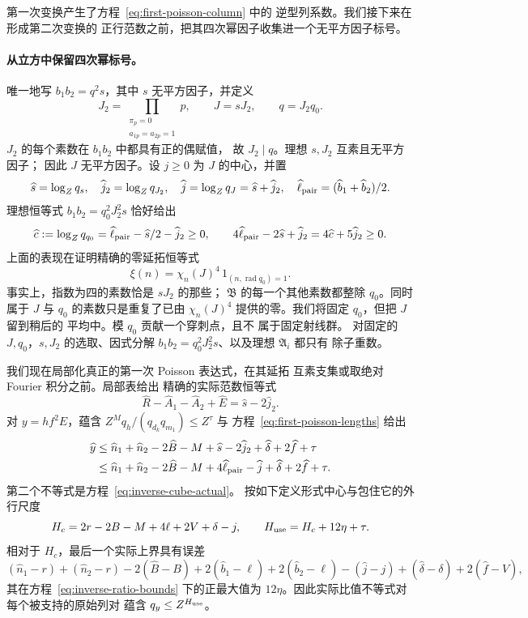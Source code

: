 第一次变换产生了方程~\eqref{eq:first-poisson-column} 中的
逆型列系数。我们接下来在形成第二次变换的
正行范数之前，把其四次幂因子收集进一个无平方因子标号。

\paragraph{从立方中保留四次幂标号。}
唯一地写 \(b_1b_2=q^2s\)，其中 \(s\) 无平方因子，并定义
\[
 J_2=\prod_{\substack{\pi_p=0\\a_{1p}=a_{2p}=1}}p,\qquad
 J=sJ_2,\qquad q=J_2q_0.
\]
\(J_2\) 的每个素数在 \(b_1b_2\) 中都具有正的偶赋值，
故 \(J_2\mid q\)。理想 \(s,J_2\) 互素且无平方因子；
因此 \(J\) 无平方因子。设 \(j\ge0\) 为 \(J\) 的中心，并置
\[
 \widehat s=\log_Zq_s,\quad \widehat j_2=\log_Zq_{J_2},\quad
 \widehat j=\log_Zq_J=\widehat s+\widehat j_2,\quad
 \widehat\ell_{\rm pair}=(\widehat b_1+\widehat b_2)/2.
\]
理想恒等式 \(b_1b_2=q_0^2J_2^2s\) 恰好给出
\begin{equation}\label{eq:inverse-cube-actual}
 \widehat c:=\log_Zq_{q_0}
   =\widehat\ell_{\rm pair}-\widehat s/2-\widehat j_2\ge0,
 \qquad
 4\widehat\ell_{\rm pair}-2\widehat s+\widehat j_2
   =4\widehat c+5\widehat j_2\ge0.
\end{equation}
上面的表现在证明精确的零延拓恒等式
\begin{equation}\label{eq:retained-cube-label}
 \xi(n)=\chi_n(J)^4\,1_{(n,\operatorname{rad}q_0)=1}.
\end{equation}
事实上，指数为四的素数恰是 \(sJ_2\) 的那些；
\(\mathfrak B\) 的每一个其他素数都整除 \(q_0\)。同时属于
\(J\) 与 \(q_0\) 的素数只是重复了已由
\(\chi_n(J)^4\) 提供的零。我们将固定 \(q_0\)，但把 \(J\) 留到稍后的
平均中。模 \(q_0\) 贡献一个穿刺点，且不
属于固定射线群。
对固定的 \(J,q_0\)，\(s,J_2\) 的选取、因式分解
\(b_1b_2=q_0^2J_2^2s\)、以及理想 \(\mathfrak A_i\) 都只有
除子重数。

我们现在局部化真正的第一次 Poisson 表达式，在其延拓
互素支集或取绝对 Fourier 积分之前。局部表给出
精确的实际范数恒等式
\[
 \widehat R-\widehat A_1-\widehat A_2+\widehat E
       =\widehat s-2\widehat j_2.
\]
对 \(y=hf^2E\)，蕴含
\(Z^Mq_h/(q_{d_k}q_{m_1})\le Z^\tau\) 与
方程~\eqref{eq:first-poisson-lengths} 给出
\[
 \begin{split}
 \widehat y
 &\le \widehat n_1+\widehat n_2-2\widehat B-M
       +\widehat s-2\widehat j_2+\widehat\delta+2\widehat f+\tau\\
 &\le \widehat n_1+\widehat n_2-2\widehat B-M
       +4\widehat\ell_{\rm pair}-\widehat j
       +\widehat\delta+2\widehat f+\tau.
 \end{split}
\]
第二个不等式是方程~\eqref{eq:inverse-cube-actual}。
按如下定义形式中心与包住它的外行尺度
\begin{equation}\label{eq:enlarged-first-frequency}
 H_c=2r-2B-M+4\ell+2V+\delta-j,\qquad
 H_{\rm use}=H_c+12\eta+\tau.
\end{equation}
相对于 \(H_c\)，最后一个实际上界具有误差
\[
 (\widehat n_1-r)+(\widehat n_2-r)-2(\widehat B-B)
 +2(\widehat b_1-\ell)+2(\widehat b_2-\ell)
 -(\widehat j-j)+(\widehat\delta-\delta)+2(\widehat f-V),
\]
其在方程~\eqref{eq:inverse-ratio-bounds} 下的正最大值为
\(12\eta\)。因此实际比值不等式对每个被支持的原始列对
蕴含 \(q_y\le Z^{H_{\rm use}}\)。

